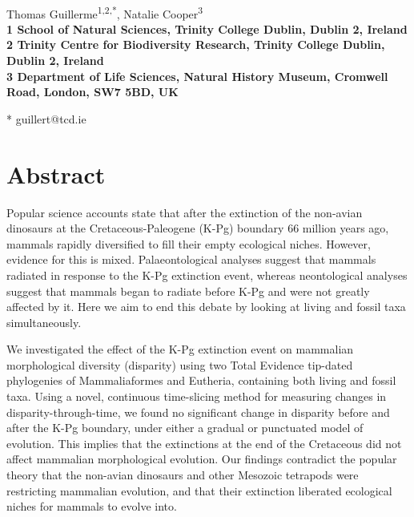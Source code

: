 \documentclass[10pt,letterpaper]{article}
\date{}
\begin{document}
\vspace*{0.35in}

\begin{flushleft}
{\Large
\textbf{}
}
\newline
\\
Thomas Guillerme\textsuperscript{1,2,*},
Natalie Cooper\textsuperscript{3}
\\
\bigskip
\bf{1} School of Natural Sciences, Trinity College Dublin, Dublin 2, Ireland
\\
\bf{2} Trinity Centre for Biodiversity Research, Trinity College Dublin, Dublin 2, Ireland
\\
\bf{3} Department of Life Sciences, Natural History Museum, Cromwell Road, London, SW7 5BD, UK
\\
\bigskip

* guillert@tcd.ie

\end{flushleft}

\section*{Abstract}
Popular science accounts state that after the extinction of the non-avian dinosaurs at the Cretaceous-Paleogene (K-Pg) boundary 66 million years ago, mammals rapidly diversified to fill their empty ecological niches.
However, evidence for this is mixed. 
Palaeontological analyses suggest that mammals radiated in response to the K-Pg extinction event, whereas neontological analyses suggest that mammals began to radiate before K-Pg and were not greatly affected by it. 
Here we aim to end this debate by looking at living and fossil taxa simultaneously.

We investigated the effect of the K-Pg extinction event on mammalian morphological diversity (disparity) using two Total Evidence tip-dated phylogenies of Mammaliaformes and Eutheria, containing both living and fossil taxa. 
Using a novel, continuous time-slicing method for measuring changes in disparity-through-time, we found no significant change in disparity before and after the K-Pg boundary, under either a gradual or punctuated model of evolution.
This implies that the extinctions at the end of the Cretaceous did not affect mammalian morphological evolution. 
Our findings contradict the popular theory that the non-avian dinosaurs and other Mesozoic tetrapods were restricting mammalian evolution, and that their extinction liberated ecological niches for mammals to evolve into.
\end{document}
